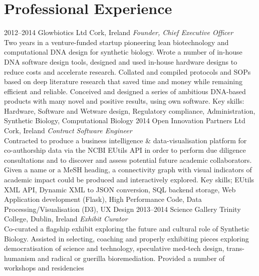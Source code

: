\documentclass[]{friggeri-cv} %
\begin{document}

\section{Professional Experience}

\begin{entrylist}
\entry
{2012--2014}
{Glowbiotics Ltd}
{Cork, Ireland}
{\emph{Founder, Chief Executive Officer} \\
Two years in a venture-funded startup pioneering lean biotechnology and computational
DNA design for synthetic biology. Wrote a number of in-house DNA software design tools,
designed and used in-house hardware designs to reduce costs and accelerate research.
Collated and compiled protocols and SOPs based on deep literature research that saved
time and money while remaining efficient and reliable. Conceived and designed a series of
ambitious DNA-based products with many novel and positive results, using own software.
Key skills: Hardware, Software and Wetware design, Regulatory compliance, Administration,
Synthetic Biology, Computational Biology
}
\entry
{2014}
{Open Innovation Partners Ltd}
{Cork, Ireland}
{\emph{Contract Software Engineer} \\
Contracted to produce a business intelligence \& data-visualisation platform for co-authorship
data via the NCBI EUtils API in order to perform due diligence consultations and to discover
and assess potential future academic collaborators. Given a name or a MeSH heading, a
connectivity graph with visual indicators of academic impact could be produced and interactively
explored.
Key skills; EUtils XML API, Dynamic XML to JSON conversion, SQL backend storage, Web Application
development (Flask), High Performance Code, Data Processing/Visualisation (D3), UX Design
}
\entry
{2013--2014}
{Science Gallery}
{Trinity College, Dublin, Ireland}
{\emph{Exhibit Curator} \\
Co-curated a flagship exhibit exploring the future and cultural role of Synthetic
Biology. Assisted in selecting, coaching and properly exhibiting pieces exploring
democratisation of science and technology, speculative med-tech design, trans-humanism
and radical or guerilla bioremediation. Provided a number of workshops and residencies
}
\end{entrylist}
\end{document}
